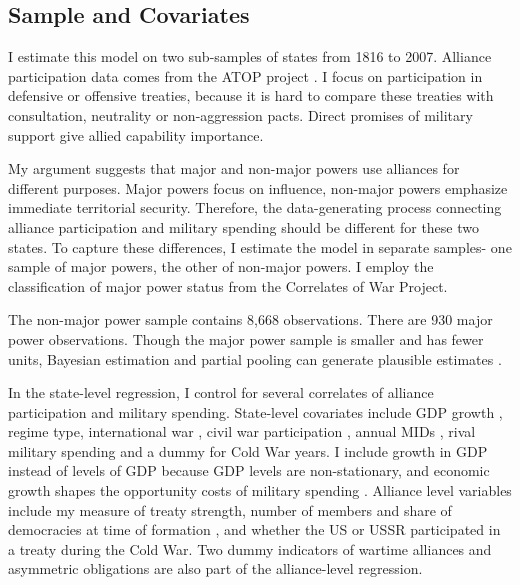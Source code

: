 \documentclass[12pt]{article}
\begin{document}
\subsection{Sample and Covariates} 

I estimate this model on two sub-samples of states from 1816 to 2007. 
Alliance participation data comes from the ATOP project \citep{Leedsetal2002}. 
I focus on participation in defensive or offensive treaties, because it is hard to compare these treaties with consultation, neutrality or non-aggression pacts. 
Direct promises of military support give allied capability importance. 


My argument suggests that major and non-major powers use alliances for different purposes.
Major powers focus on influence, non-major powers emphasize immediate territorial security.  
Therefore, the data-generating process connecting alliance participation and military spending should be different for these two states. 
To capture these differences, I estimate the model in separate samples- one sample of major powers, the other of non-major powers.
I employ the classification of major power status from the Correlates of War Project. 


The non-major power sample contains 8,668 observations. 
There are 930 major power observations. 
Though the major power sample is smaller and has fewer units, Bayesian estimation and partial pooling can generate plausible estimates \citep{Stegmueller2013}. 


In the state-level regression, I control for several correlates of alliance participation and military spending. 
State-level covariates include GDP growth \citep{Boltetal2018}, regime type, international war \citep{Reiteretal2016}, civil war participation \citep{SarkeesWayman2010}, annual MIDs \citep{Gibleretal2016}, rival military spending \citep{ThompsonDreyer2012} and a dummy for Cold War years.
I include growth in GDP instead of levels of GDP because GDP levels are non-stationary, and economic growth shapes the opportunity costs of military spending \citep{Kimball2010, Zielinskietal2017}.
Alliance level variables include my measure of treaty strength, number of members and share of democracies at time of formation \citep{Chibaetal2015}, and whether the US or USSR participated in a treaty during the Cold War. 
Two dummy indicators of wartime alliances and asymmetric obligations \citep{Leedsetal2002} are also part of the alliance-level regression. 
\end{document}
